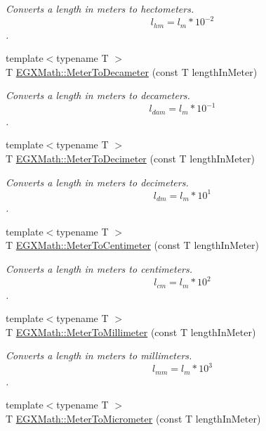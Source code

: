 \begin{DoxyCompactItemize}
\begin{DoxyCompactList}\small\item\em Converts a length in meters to hectometers. \[ l_{hm}=l_{m} * 10^{-2} \]. \end{DoxyCompactList}\item 
{\footnotesize template$<$typename T $>$ }\\T \mbox{\hyperlink{group___e_g_x_math-_conversions-_length_conversions-_meter-_s_i_ga1b18e63d03025512566c5f55ad4e0c89}{E\+G\+X\+Math\+::\+Meter\+To\+Decameter}} (const T length\+In\+Meter)
\begin{DoxyCompactList}\small\item\em Converts a length in meters to decameters. \[ l_{dam}=l_{m} * 10^{-1} \]. \end{DoxyCompactList}\item 
{\footnotesize template$<$typename T $>$ }\\T \mbox{\hyperlink{group___e_g_x_math-_conversions-_length_conversions-_meter-_s_i_ga4caa9cd21d4f78039b1ceddf1f0ea5fd}{E\+G\+X\+Math\+::\+Meter\+To\+Decimeter}} (const T length\+In\+Meter)
\begin{DoxyCompactList}\small\item\em Converts a length in meters to decimeters. \[ l_{dm}=l_{m} * 10^{1} \]. \end{DoxyCompactList}\item 
{\footnotesize template$<$typename T $>$ }\\T \mbox{\hyperlink{group___e_g_x_math-_conversions-_length_conversions-_meter-_s_i_gab70c34d0ee4bf48225d48e48b28f808a}{E\+G\+X\+Math\+::\+Meter\+To\+Centimeter}} (const T length\+In\+Meter)
\begin{DoxyCompactList}\small\item\em Converts a length in meters to centimeters. \[ l_{cm}=l_{m} * 10^{2} \]. \end{DoxyCompactList}\item 
{\footnotesize template$<$typename T $>$ }\\T \mbox{\hyperlink{group___e_g_x_math-_conversions-_length_conversions-_meter-_s_i_ga9bd519d9f6b1a52f85e7817f4f81690b}{E\+G\+X\+Math\+::\+Meter\+To\+Millimeter}} (const T length\+In\+Meter)
\begin{DoxyCompactList}\small\item\em Converts a length in meters to millimeters. \[ l_{mm}=l_{m} * 10^{3} \]. \end{DoxyCompactList}\item 
{\footnotesize template$<$typename T $>$ }\\T \mbox{\hyperlink{group___e_g_x_math-_conversions-_length_conversions-_meter-_s_i_gac0114c26af780ce603948df83f5e338e}{E\+G\+X\+Math\+::\+Meter\+To\+Micrometer}} (const T length\+In\+Meter)

\end{DoxyCompactItemize}
